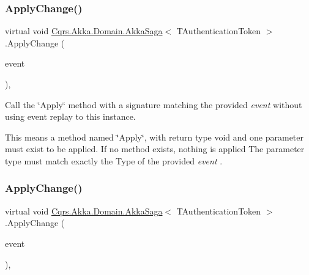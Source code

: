 \subsubsection{\texorpdfstring{Apply\+Change()}{ApplyChange()}\hspace{0.1cm}{\footnotesize\ttfamily [1/2]}}
{\footnotesize\ttfamily virtual void \hyperlink{classCqrs_1_1Akka_1_1Domain_1_1AkkaSaga}{Cqrs.\+Akka.\+Domain.\+Akka\+Saga}$<$ T\+Authentication\+Token $>$.Apply\+Change (\begin{DoxyParamCaption}\item[{\hyperlink{interfaceCqrs_1_1Events_1_1ISagaEvent}{I\+Saga\+Event}$<$ T\+Authentication\+Token $>$ @}]{event }\end{DoxyParamCaption})\hspace{0.3cm}{\ttfamily [protected]}, {\ttfamily [virtual]}}



Call the \char`\"{}\+Apply\char`\"{} method with a signature matching the provided {\itshape event}  without using event replay to this instance. 

This means a method named \char`\"{}\+Apply\char`\"{}, with return type void and one parameter must exist to be applied. If no method exists, nothing is applied The parameter type must match exactly the Type of the provided {\itshape event} . \mbox{\label{classCqrs_1_1Akka_1_1Domain_1_1AkkaSaga_a18d554cd5ad329ab152efb7d852f2438_a18d554cd5ad329ab152efb7d852f2438}} 
\subsubsection{\texorpdfstring{Apply\+Change()}{ApplyChange()}\hspace{0.1cm}{\footnotesize\ttfamily [2/2]}}
{\footnotesize\ttfamily virtual void \hyperlink{classCqrs_1_1Akka_1_1Domain_1_1AkkaSaga}{Cqrs.\+Akka.\+Domain.\+Akka\+Saga}$<$ T\+Authentication\+Token $>$.Apply\+Change (\begin{DoxyParamCaption}\item[{\hyperlink{interfaceCqrs_1_1Events_1_1IEvent}{I\+Event}$<$ T\+Authentication\+Token $>$ @}]{event }\end{DoxyParamCaption})\hspace{0.3cm}{\ttfamily [protected]}, {\ttfamily [virtual]}}



